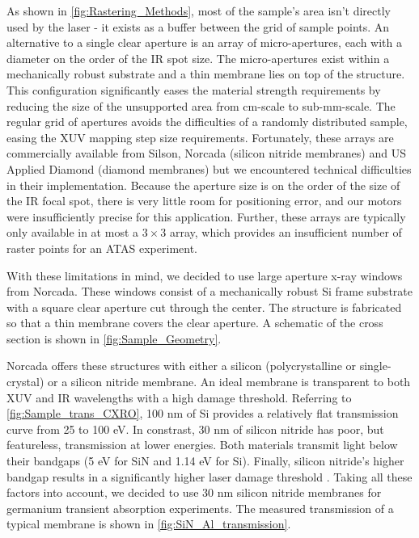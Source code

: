 As shown in \cref{fig:Rastering_Methods}, most of the sample's area isn't directly used by the laser - it exists as a buffer between the grid of sample points. An alternative to a single clear aperture is an array of micro-apertures, each with a diameter on the order of the IR spot size. The micro-apertures exist within a mechanically robust substrate and a thin membrane lies on top of the structure. This configuration significantly eases the material strength requirements by reducing the size of the unsupported area from cm-scale to sub-mm-scale. The regular grid of apertures avoids the difficulties of a randomly distributed sample, easing the XUV mapping step size requirements. Fortunately, these arrays are commercially available from Silson, Norcada (silicon nitride membranes) and US Applied Diamond (diamond membranes) but we encountered technical difficulties in their implementation. Because the aperture size is on the order of the size of the IR focal spot, there is very little room for positioning error, and our motors were insufficiently precise for this application. Further, these arrays are typically only available in at most a $3\times3$ array, which provides an insufficient number of raster points for an ATAS experiment.

With these limitations in mind, we decided to use large aperture x-ray windows from Norcada. These windows consist of a mechanically robust Si frame substrate with a square clear aperture cut through the center. The structure is fabricated so that a thin membrane covers the clear aperture. A schematic of the cross section is shown in \cref{fig:Sample_Geometry}.

Norcada offers these structures with either a silicon (polycrystalline or single-crystal) or a silicon nitride membrane. An ideal membrane is transparent to both XUV and IR wavelengths with a high damage threshold. Referring to \cref{fig:Sample_trans_CXRO}, 100 nm of Si provides a relatively flat transmission curve from 25 to 100 eV. In constrast, 30 nm of silicon nitride has poor, but featureless, transmission at lower energies. Both materials transmit light below their bandgaps (5 eV for SiN and 1.14 eV for Si). Finally, silicon nitride's higher bandgap results in a significantly higher laser damage threshold \cite{gamalyAblationSolidsFemtosecond2002,austinFemtosecondLaserDamage2018,keldyshIonizationFieldStrong1965}. Taking all these factors into account, we decided to use 30 nm silicon nitride membranes for germanium transient absorption experiments. The measured transmission of a typical membrane is shown in \cref{fig:SiN_Al_transmission}.


